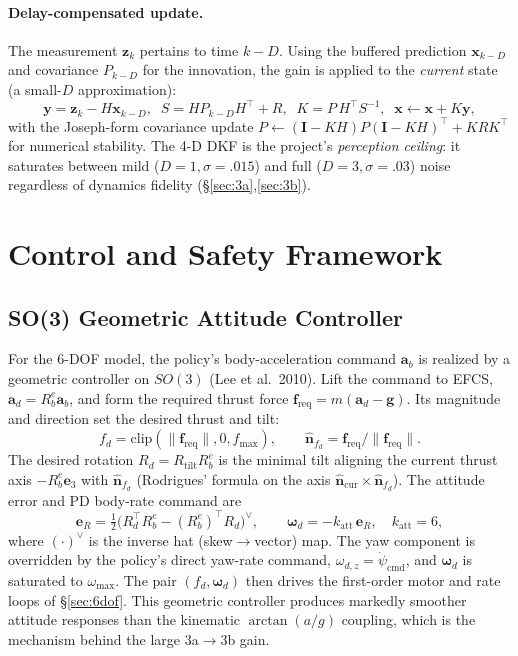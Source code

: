 \documentclass[11pt]{article}
\begin{document}
\paragraph{Delay-compensated update.} The measurement $\mathbf z_k$ pertains to
time $k\!-\!D$. Using the buffered prediction $\mathbf x_{k-D}$ and covariance
$P_{k-D}$ for the innovation, the gain is applied to the \emph{current} state
(a small-$D$ approximation):
\begin{equation}
\mathbf y=\mathbf z_k-H\mathbf x_{k-D},\;\;
S=HP_{k-D}H^\top+R,\;\;
K=P\,H^\top S^{-1},\;\;
\mathbf x\leftarrow\mathbf x+K\mathbf y,
\end{equation}
with the Joseph-form covariance update
$P\leftarrow(\mathbf I-KH)P(\mathbf I-KH)^\top+KRK^\top$ for numerical
stability. The 4-D DKF is the project's \emph{perception ceiling}: it saturates
between mild ($D{=}1,\sigma{=}.015$) and full ($D{=}3,\sigma{=}.03$) noise
regardless of dynamics fidelity (\S\ref{sec:3a},\ref{sec:3b}).

\section{Control and Safety Framework}
\label{sec:control}
\subsection{SO(3) Geometric Attitude Controller}
\label{sec:so3}
For the 6-DOF model, the policy's body-acceleration command $\mathbf a_b$ is
realized by a geometric controller on $SO(3)$ (Lee et al.\ 2010). Lift the
command to EFCS, $\mathbf a_d=R_b^e\mathbf a_b$, and form the required thrust
force $\mathbf f_\text{req}=m(\mathbf a_d-\mathbf g)$. Its magnitude and
direction set the desired thrust and tilt:
\begin{equation}
f_d=\mathrm{clip}(\lVert\mathbf f_\text{req}\rVert,0,f_{\max}),\qquad
\hat{\mathbf n}_{f_d}=\mathbf f_\text{req}/\lVert\mathbf f_\text{req}\rVert .
\end{equation}
The desired rotation $R_d=R_\text{tilt}R_b^e$ is the minimal tilt aligning the
current thrust axis $-R_b^e\mathbf e_3$ with $\hat{\mathbf n}_{f_d}$
(Rodrigues' formula on the axis $\hat{\mathbf n}_\text{cur}\times\hat{\mathbf n}_{f_d}$).
The attitude error and PD body-rate command are
\begin{equation}
\mathbf e_R=\tfrac12\big(R_d^\top R_b^e-(R_b^e)^\top R_d\big)^\vee,\qquad
\bm\omega_d=-k_\text{att}\,\mathbf e_R,\quad k_\text{att}=6,
\label{eq:so3}
\end{equation}
where $(\cdot)^\vee$ is the inverse hat (skew$\rightarrow$vector) map. The yaw
component is overridden by the policy's direct yaw-rate command,
$\omega_{d,z}=\dot\psi_\text{cmd}$, and $\bm\omega_d$ is saturated to
$\omega_{\max}$. The pair $(f_d,\bm\omega_d)$ then drives the first-order motor
and rate loops of \S\ref{sec:6dof}. This geometric controller produces
markedly smoother attitude responses than the kinematic $\arctan(a/g)$
coupling, which is the mechanism behind the large 3a$\rightarrow$3b gain.
\end{document}
